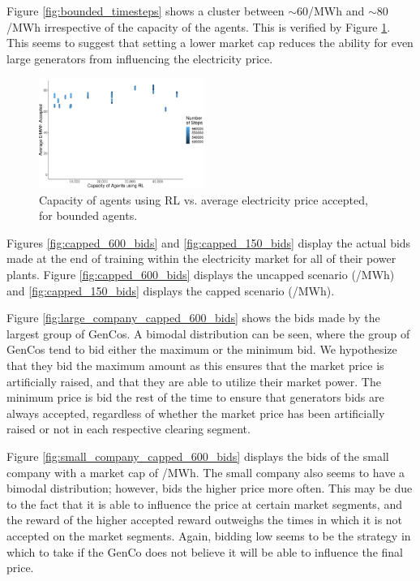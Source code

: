 \documentclass[conference]{IEEEtran}
\begin{document}
Figure \ref{fig:bounded_timesteps} shows a cluster between ${\sim}$\textsterling$60$/MWh and ${\sim}$\textsterling$80$/MWh irrespective of the capacity of the agents. This is verified by Figure \ref{fig:bounded_results_scatter}. This seems to suggest that setting a lower market cap reduces the ability for even large generators from influencing the electricity price.






\begin{figure}
    \includegraphics[width=0.48\textwidth]{figures/results/bounded_results_scatter.pdf}
    \caption{Capacity of agents using RL vs. average electricity price accepted, for bounded agents.}
    \label{fig:bounded_results_scatter}
\end{figure}



Figures \ref{fig:capped_600_bids} and \ref{fig:capped_150_bids} display the actual bids made at the end of training within the electricity market for all of their power plants. Figure \ref{fig:capped_600_bids} displays the uncapped scenario (/MWh) and \ref{fig:capped_150_bids} displays the capped scenario (/MWh).

Figure \ref{fig:large_company_capped_600_bids} shows the bids made by the largest group of GenCos. A bimodal distribution can be seen, where the group of GenCos tend to bid either the maximum or the minimum bid. We hypothesize that they bid the maximum amount as this ensures that the market price is artificially raised, and that they are able to utilize their market power. The minimum price is bid the rest of the time to ensure that generators bids are always accepted, regardless of whether the market price has been artificially raised or not in each respective clearing segment.

Figure \ref{fig:small_company_capped_600_bids} displays the bids of the small company with a market cap of /MWh. The small company also seems to have a bimodal distribution; however, bids the higher price more often. This may be due to the fact that it is able to influence the price at certain market segments, and the reward of the higher accepted reward outweighs the times in which it is not accepted on the market segments. Again, bidding low seems to be the strategy in which to take if the GenCo does not believe it will be able to influence the final price.
\end{document}
